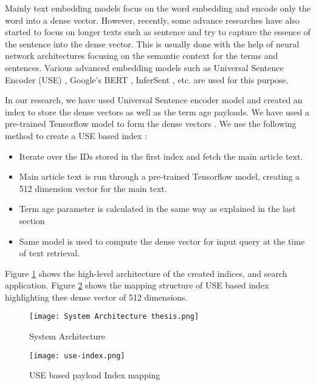 Mainly text embedding models focus on the word embedding and encode only the word into a dense vector. However, recently, some advance researches have also started to focus on longer texts such as sentence and try to capture the essence of the sentence into the dense vector. This is usually done with the help of neural network architectures focusing on the semantic context for the terms and sentences. Various advanced embedding models such as  Universal Sentence Encoder (USE) \cite{RN32}, Google’s BERT  \cite{DBLP:journals/corr/abs-1810-04805}, InferSent \cite{DBLP:journals/corr/ConneauKSBB17}, etc. are used for this purpose.


In our research, we have used Universal Sentence encoder model and created an index to store the dense vectors as well as the term age payloads. We have used a pre-trained Tensorflow model to form the dense vectors \cite{google2018use}. We use the following method to create a USE based index :
\begin{itemize}
    \item Iterate over the IDs stored in the first index and fetch the main article text.
    \item Main article text is run through a pre-trained Tensorflow model, creating a 512 dimension vector for the main text.
    \item Term age parameter is calculated in the same way as explained in the last section
    \item Same model is used to compute the dense vector for input query at the time of text retrieval.
\end{itemize}
Figure \ref{fig:architecture} shows the high-level architecture of the created indices, and search application.
Figure \ref{fig:use-index-mapping} shows the mapping structure of USE based index highlighting thee dense vector of 512 dimensions.
\begin{figure}
    \centering
    \texttt{[image: System Architecture thesis.png]}
    \caption{System Architecture}
    \label{fig:architecture}
\end{figure}

\begin{figure}[h!]
    \centering
    \texttt{[image: use-index.png]}
    \caption{USE based payload Index mapping}
    \label{fig:use-index-mapping}
\end{figure}

